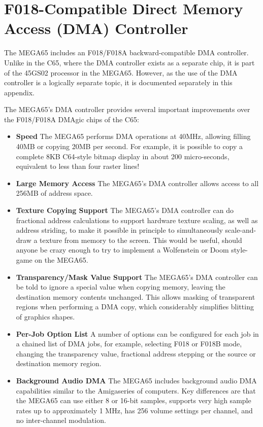 \chapter{F018-Compatible Direct Memory Access (DMA) Controller}
\label{cha:dmagic}

The MEGA65 includes an F018/F018A backward-compatible DMA controller.
Unlike in the C65, where the DMA controller exists as a separate
chip, it is part of the 45GS02 processor in the MEGA65.  However, as the
use of the DMA controller is a logically separate topic, it is documented
separately in this appendix.

The MEGA65's DMA controller provides several important improvements over the
F018/F018A DMAgic chips of the C65:

\begin{itemize}
\item{\bf Speed} The MEGA65 performs DMA operations at 40MHz, allowing filling 40MB or copying 20MB
  per second.  For example, it is possible to copy a complete 8KB C64-style bitmap display in
  about 200 micro-seconds, equivalent to less than four raster lines!
 \item{\bf Large Memory Access} The MEGA65's DMA controller allows access to all 256MB of address space.
\item{\bf Texture Copying Support} The MEGA65's DMA controller can do fractional address calculations
  to support hardware texture scaling, as well as address striding, to make it possible in principle
  to simultaneously scale-and-draw a texture from memory to the screen. This would be useful, should
  anyone be crazy enough to try to implement a Wolfenstein or Doom style-game on the MEGA65.
\item{\bf Transparency/Mask Value Support} The MEGA65's DMA controller can be told to ignore a special value
   when copying memory, leaving the destination memory contents unchanged. This allows masking of transparent
   regions when performing a DMA copy, which considerably simplifies blitting of graphics shapes.
\item{\bf Per-Job Option List} A number of options can be configured for each job in a chained list of DMA
  jobs, for example, selecting F018 or F018B mode, changing the transparency value, fractional address stepping
  or the source or destination memory region.

\item{\bf Background Audio DMA}
  The MEGA65 includes background audio DMA capabilities similar to the Amiga\texttrademark series of computers.
  Key differences are that the MEGA65 can use either 8 or 16-bit samples, supports very high sample rates
  up to approximately 1 MHz, has 256 volume settings per channel, and no inter-channel modulation.

\end{itemize}


